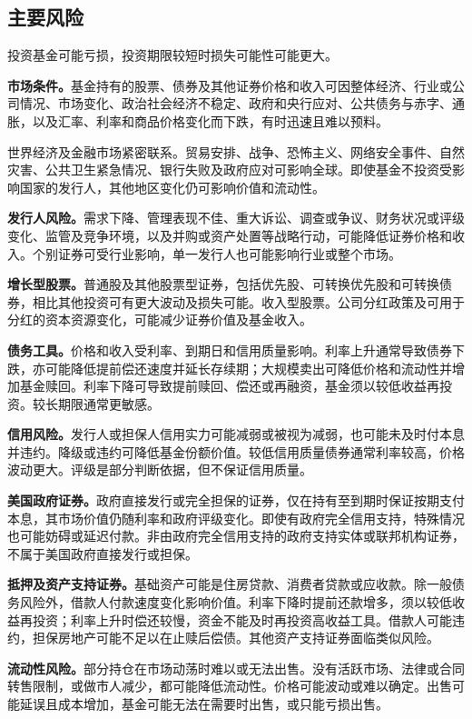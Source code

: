 \documentclass[UTF8,fontset=none,11pt,a4paper]{ctexart}
\begin{document}
\subsection*{主要风险}
投资基金可能亏损，投资期限较短时损失可能性可能更大。


\textbf{市场条件。}基金持有的股票、债券及其他证券价格和收入可因整体经济、行业或公司情况、市场变化、政治社会经济不稳定、政府和央行应对、公共债务与赤字、通胀，以及汇率、利率和商品价格变化而下跌，有时迅速且难以预料。


世界经济及金融市场紧密联系。贸易安排、战争、恐怖主义、网络安全事件、自然灾害、公共卫生紧急情况、银行失败及政府应对可影响全球。即使基金不投资受影响国家的发行人，其他地区变化仍可影响价值和流动性。


\textbf{发行人风险。}需求下降、管理表现不佳、重大诉讼、调查或争议、财务状况或评级变化、监管及竞争环境，以及并购或资产处置等战略行动，可能降低证券价格和收入。个别证券可受行业影响，单一发行人也可能影响行业或整个市场。


\textbf{增长型股票。}普通股及其他股票型证券，包括优先股、可转换优先股和可转换债券，相比其他投资可有更大波动及损失可能。收入型股票。公司分红政策及可用于分红的资本资源变化，可能减少证券价值及基金收入。


\textbf{债务工具。}价格和收入受利率、到期日和信用质量影响。利率上升通常导致债券下跌，亦可能降低提前偿还速度并延长存续期；大规模卖出可降低价格和流动性并增加基金赎回。利率下降可导致提前赎回、偿还或再融资，基金须以较低收益再投资。较长期限通常更敏感。


\textbf{信用风险。}发行人或担保人信用实力可能减弱或被视为减弱，也可能未及时付本息并违约。降级或违约可降低基金份额价值。较低信用质量债券通常利率较高，价格波动更大。评级是部分判断依据，但不保证信用质量。


\textbf{美国政府证券。}政府直接发行或完全担保的证券，仅在持有至到期时保证按期支付本息，其市场价值仍随利率和政府评级变化。即使有政府完全信用支持，特殊情况也可能妨碍或延迟付款。非由政府完全信用支持的政府支持实体或联邦机构证券，不属于美国政府直接发行或担保。


\textbf{抵押及资产支持证券。}基础资产可能是住房贷款、消费者贷款或应收款。除一般债务风险外，借款人付款速度变化影响价值。利率下降时提前还款增多，须以较低收益再投资；利率上升时偿还较慢，资金不能及时再投资高收益工具。借款人可能违约，担保房地产可能不足以在止赎后偿债。其他资产支持证券面临类似风险。


\textbf{流动性风险。}部分持仓在市场动荡时难以或无法出售。没有活跃市场、法律或合同转售限制，或做市人减少，都可能降低流动性。价格可能波动或难以确定。出售可能延误且成本增加，基金可能无法在需要时出售，或只能亏损出售。
\end{document}
